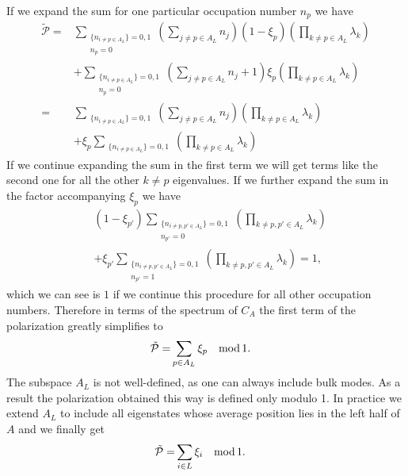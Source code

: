 \documentclass[twocolumn,amsmath,longbibliography,amssymb,superscriptaddress]{revtex4-1}
\begin{document}
If we expand the sum for one particular occupation number $n_p$ we have
\begin{align}
\tilde{\mathcal{P}} =& \sum_{\substack{\{n_{i \neq p \in A_L}\} = 0,1 \\ n_p=0}} \left(\sum_{j\neq p \in A_{L}} n_j \right) (1-\xi_p)\left(\prod_{k \neq p\in A_L} \lambda_k \right) \\
&+ \sum_{\substack{\{n_{i \neq p \in A_L}\} = 0,1 \\ n_p=0}} \left(\sum_{j\neq p \in A_{L}} n_j+1 \right)\xi_p \left(\prod_{k \neq p\in A_L} \lambda_k \right) \\
=& \sum_{\substack{\{n_{i \neq p \in A_L}\} = 0,1 }} \left(\sum_{j\neq p \in A_{L}} n_j \right) \left(\prod_{k \neq p\in A_L} \lambda_k \right) \\
&+ \xi_p \sum_{\substack{\{n_{i \neq p \in A_L}\} = 0,1 }} \left(\prod_{k \neq p\in A_L} \lambda_k \right) 
\end{align}
If we continue expanding the sum in the first term we will get terms like the second one for all the other $k\neq p$ eigenvalues. If we further expand the sum in the factor accompanying $\xi_p$ we have
\begin{align}
&(1-\xi_{p'})\sum_{\substack{\{n_{i \neq p,p' \in A_L}\} = 0,1 \\ n_{p'}=0}} \left(\prod_{k \neq p,p'\in A_L} \lambda_k\right) \\
&+ \xi_{p'}\sum_{\substack{\{n_{i \neq p,p' \in A_L}\} = 0,1 \\ n_{p'}=1}} \left(\prod_{k \neq p,p'\in A_L}\lambda_k\right) =1,
\end{align}
which we can see is $1$ if we continue this procedure for all other occupation numbers. Therefore in terms of the spectrum of $C_A$ the first term of the polarization greatly simplifies to 
\begin{align}
\tilde{\mathcal{P}} =& \sum_{p\in A_L}\xi_p  \quad {\rm mod}\, 1.
\end{align}
The subspace $A_L$ is not well-defined, as one can always include bulk modes. As a result the polarization obtained this way is defined only modulo 1. In practice we extend $A_L$ to include all eigenstates whose average position lies in the left half of $A$ and we finally get
\begin{align}
\tilde{\mathcal{P}} =& \sum_{i\in L}\xi_i \quad {\rm mod}\, 1.
\label{eq:polarization_left}
\end{align}
\end{document}
